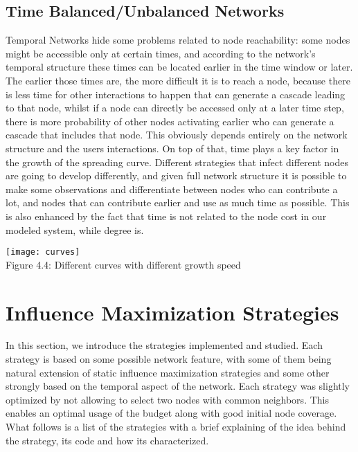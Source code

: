 \subsection{Time Balanced/Unbalanced Networks}
\label{sec:timenets}
Temporal Networks hide some problems related to node reachability: some nodes might be accessible only at certain times, and according to the network's temporal structure these times can be located earlier in the time window or later. The earlier those times are, the more difficult it is to reach a node, because there is less time for other interactions to happen that can generate a cascade leading to that node, whilst if a node can directly be accessed only at a later time step, there is more probability of other nodes activating earlier who can generate a cascade that includes that node. This obviously depends entirely on the network structure and the users interactions.
On top of that, time plays a key factor in the growth of the spreading curve. Different strategies that infect different nodes are going to develop differently, and given full network structure it is possible to make some observations and differentiate between nodes who can contribute a lot, and nodes that can contribute earlier and use as much time as possible. This is also enhanced by the fact that time is not related to the node cost in our modeled system, while degree is.

\begin{center}
    \texttt{[image: curves]}
    \\
    Figure 4.4: Different curves with different growth speed
\end{center}

\section{Influence Maximization Strategies}
\label{sec:strats}
In this section, we introduce the strategies implemented and studied. Each strategy is based on some possible network feature, with some of them being natural extension of static influence maximization strategies and some other strongly based on the temporal aspect of the network.
Each strategy was slightly optimized by not allowing to select two nodes with common neighbors. This enables an optimal usage of the budget along with good initial node coverage. What follows is a list of the strategies with a brief explaining of the idea behind the strategy, its code and how its characterized.

